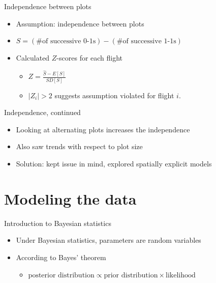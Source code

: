 \documentclass{beamer}
\begin{document}
\begin{frame}{Independence between plots}
	\begin{itemize}
		\item Assumption: independence between plots
		\item $S=(\text{\# of successive 0-1s})-(\text{\# of successive 1-1s})$
		\item Calculated $Z$-scores for each flight
			\begin{itemize}
				\item $Z=\frac{\hat{S}-E[S]}{SD[S]}$
				\item $|Z_i|>2$ suggests assumption violated for flight $i$.
			\end{itemize}
	\end{itemize}
\end{frame}

\begin{frame}{Independence, continued}

	\begin{itemize}
		\item Looking at alternating plots increases the independence
		\item Also saw trends with respect to plot size
		\item Solution: kept issue in mind, explored spatially explicit models
	\end{itemize}
\end{frame}

\section{Modeling the data}
\begin{frame}{Introduction to Bayesian statistics}
	\begin{itemize}
		\item Under Bayesian statistics, parameters are random variables
		\item According to Bayes' theorem
		\begin{itemize}
			\item $\text{posterior distribution} \propto \text{prior 
			distribution}\times \text{likelihood}$
		\end{itemize}
	\end{itemize}
\end{frame}
\end{document}
